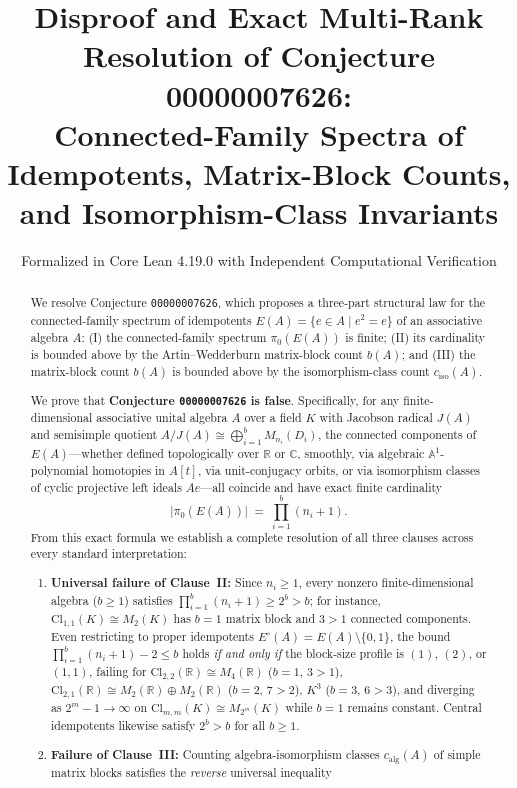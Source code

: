 \documentclass[11pt,a4paper]{article}
\title{\textbf{Disproof and Exact Multi-Rank Resolution of Conjecture 00000007626:\\
Connected-Family Spectra of Idempotents, Matrix-Block Counts,\\
and Isomorphism-Class Invariants}}
\author{Formalized in Core Lean 4.19.0 with Independent Computational Verification}
\date{}
\theoremstyle{definition}
\newcommand{\R}{\mathbb{R}}
\newcommand{\C}{\mathbb{C}}
\newcommand{\Cl}{\mathrm{Cl}}
\begin{document}
\maketitle

\begin{abstract}
We resolve Conjecture \texttt{00000007626}, which proposes a three-part structural law for
the connected-family spectrum of idempotents $E(A)=\{e\in A\mid e^2=e\}$ of an associative
algebra $A$: (I) the connected-family spectrum $\pi_0(E(A))$ is finite; (II) its cardinality
is bounded above by the Artin--Wedderburn matrix-block count $b(A)$; and (III) the
matrix-block count $b(A)$ is bounded above by the isomorphism-class count $c_{\mathrm{iso}}(A)$.

We prove that \textbf{Conjecture \texttt{00000007626} is false}. Specifically, for any
finite-dimensional associative unital algebra $A$ over a field $K$ with Jacobson radical
$J(A)$ and semisimple quotient $A/J(A)\cong\bigoplus_{i=1}^b M_{n_i}(D_i)$, the connected
components of $E(A)$---whether defined topologically over $\R$ or $\C$, smoothly, via
algebraic $\mathbb{A}^1$-polynomial homotopies in $A[t]$, via unit-conjugacy orbits, or via
isomorphism classes of cyclic projective left ideals $Ae$---all coincide and have exact
finite cardinality
\[
  \bigl|\pi_0(E(A))\bigr| \;=\; \prod_{i=1}^{b}(n_i + 1).
\]
From this exact formula we establish a complete resolution of all three clauses across every
standard interpretation:
\begin{enumerate}
  \setlength{\itemsep}{2pt}
  \item \textbf{Universal failure of Clause~II:} Since $n_i\ge 1$, every nonzero
    finite-dimensional algebra ($b\ge 1$) satisfies $\prod_{i=1}^b(n_i+1)\ge 2^b > b$; for
    instance, $\Cl_{1,1}(K)\cong M_2(K)$ has $b=1$ matrix block and $3>1$ connected
    components. Even restricting to proper idempotents $E^\circ(A)=E(A)\setminus\{0,1\}$,
    the bound $\prod_{i=1}^b(n_i+1)-2\le b$ holds \emph{if and only if} the block-size
    profile is $(1)$, $(2)$, or $(1,1)$, failing for $\Cl_{2,2}(\R)\cong M_4(\R)$ ($b=1$,
    $3>1$), $\Cl_{2,1}(\R)\cong M_2(\R)\oplus M_2(\R)$ ($b=2$, $7>2$), $K^3$ ($b=3$, $6>3$),
    and diverging as $2^m-1\to\infty$ on $\Cl_{m,m}(K)\cong M_{2^m}(K)$ while $b=1$ remains
    constant. Central idempotents likewise satisfy $2^b > b$ for all $b\ge 1$.
  \item \textbf{Failure of Clause~III:} Counting algebra-isomorphism classes $c_{\mathrm{alg}}(A)$
    of simple matrix blocks satisfies the \emph{reverse} universal inequality

\end{enumerate}
\end{abstract}
\end{document}
